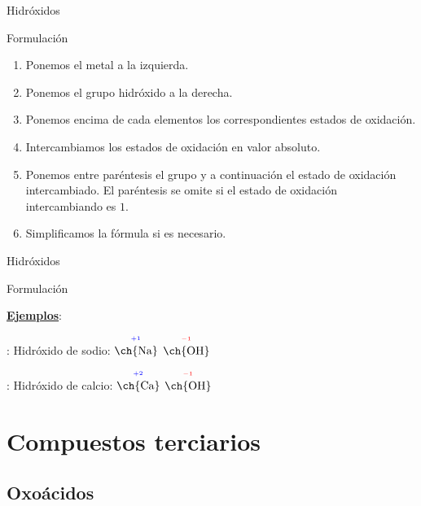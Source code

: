 \documentclass{beamer}
\newcommand{\eob}[2]{$\overset{^{\color{blue}#1}}{\text{\ch{#2}}}$}
\newcommand{\eor}[2]{$\overset{^{\color{red}#1}}{\text{\ch{#2}}}$}
\begin{document}
\begin{frame}[c]{Hidróxidos}
    \begin{exampleblock}{\Large Formulación}\vspace*{5pt}
        \begin{enumerate}[label=\itembolascolor{\arabic*}{mDarkTeal}]
            \item Ponemos el metal a la izquierda.
            \item Ponemos el grupo hidróxido  a la derecha.
            \item Ponemos encima de cada elementos los correspondientes estados de oxidación.
            \item Intercambiamos los estados de oxidación en valor absoluto.
            \item Ponemos entre paréntesis el grupo  y a continuación el estado de oxidación intercambiado. El paréntesis se omite si el estado de oxidación intercambiando es $1$.
            \item Simplificamos la fórmula si es necesario.
        \end{enumerate}
    \end{exampleblock}
\end{frame}

\begin{frame}[c]{Hidróxidos}
    \begin{exampleblock}{\Large Formulación}\vspace*{5pt}

        \textbf{\uline{Ejemplos}}:

        : Hidróxido de sodio: \eob{+1}{Na} \eor{-1}{OH}  \ch{->} 

        : Hidróxido de calcio: \eob{+2}{Ca} \eor{-1}{OH}  \ch{->} 
    \end{exampleblock}
\end{frame}

\section{Compuestos terciarios}
\subsection{Oxoácidos}
\end{document}
